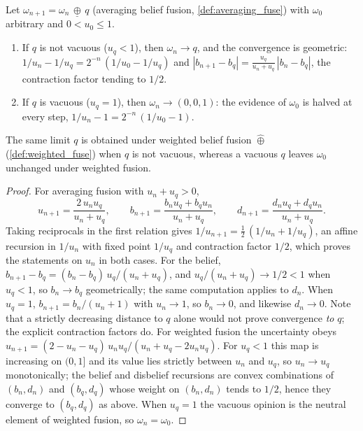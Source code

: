 \begin{theorem}\label{thm:abf}
Let $\omega_{n+1} = \omega_n \,\underline{\oplus}\, q$ (averaging belief fusion, \cref{def:averaging_fuse}) with $\omega_0$ arbitrary and $0 < u_0 \le 1$.
\begin{enumerate}
    \item If $q$ is not vacuous ($u_q < 1$), then $\omega_n \to q$, and the convergence is geometric: $1/u_{n} - 1/u_q = 2^{-n}\,(1/u_0 - 1/u_q)$ and $|b_{n+1} - b_q| = \frac{u_q}{u_n + u_q}\,|b_n - b_q|$, the contraction factor tending to $1/2$.
    \item If $q$ is vacuous ($u_q = 1$), then $\omega_n \to (0, 0, 1)$: the evidence of $\omega_0$ is halved at every step, $1/u_n - 1 = 2^{-n}\,(1/u_0 - 1)$.
\end{enumerate}
The same limit $q$ is obtained under weighted belief fusion $\hat{\oplus}$ (\cref{def:weighted_fuse}) when $q$ is not vacuous, whereas a vacuous $q$ leaves $\omega_0$ unchanged under weighted fusion.
\end{theorem}
\begin{proof}
For averaging fusion with $u_n + u_q > 0$,
\[
u_{n+1} = \frac{2\, u_n u_q}{u_n + u_q}, \qquad
b_{n+1} = \frac{b_n u_q + b_q u_n}{u_n + u_q}, \qquad
d_{n+1} = \frac{d_n u_q + d_q u_n}{u_n + u_q}.
\]
Taking reciprocals in the first relation gives $1/u_{n+1} = \tfrac12\,(1/u_n + 1/u_q)$, an affine recursion in $1/u_n$ with fixed point $1/u_q$ and contraction factor $1/2$, which proves the statements on $u_n$ in both cases. For the belief, $b_{n+1} - b_q = (b_n - b_q)\, u_q/(u_n + u_q)$, and $u_q/(u_n + u_q) \to 1/2 < 1$ when $u_q < 1$, so $b_n \to b_q$ geometrically; the same computation applies to $d_n$. When $u_q = 1$, $b_{n+1} = b_n/(u_n + 1)$ with $u_n \to 1$, so $b_n \to 0$, and likewise $d_n \to 0$. Note that a strictly decreasing distance to $q$ alone would not prove convergence \emph{to} $q$; the explicit contraction factors do. For weighted fusion the uncertainty obeys $u_{n+1} = (2 - u_n - u_q)\, u_n u_q / (u_n + u_q - 2 u_n u_q)$. For $u_q < 1$ this map is increasing on $(0,1]$ and its value lies strictly between $u_n$ and $u_q$, so $u_n \to u_q$ monotonically; the belief and disbelief recursions are convex combinations of $(b_n, d_n)$ and $(b_q, d_q)$ whose weight on $(b_n, d_n)$ tends to $1/2$, hence they converge to $(b_q, d_q)$ as above. When $u_q = 1$ the vacuous opinion is the neutral element of weighted fusion, so $\omega_n = \omega_0$.
\end{proof}

